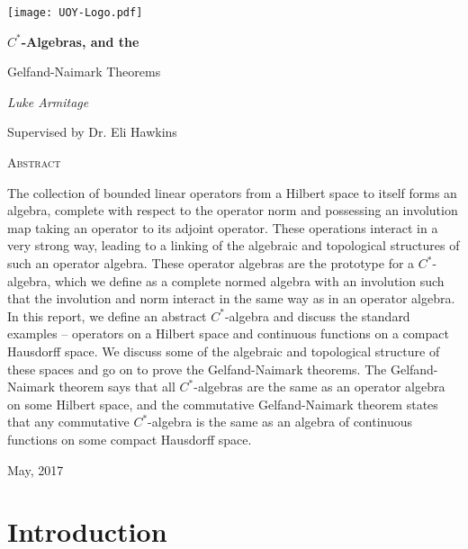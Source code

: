 \documentclass[11pt,a4paper]{report}
\theoremstyle{plain}
\theoremstyle{definition}
\newcommand{\1}{\mathbbm{1}}
\begin{document}
\begin{titlepage}
	{\centering
	{\texttt{[image: UOY-Logo.pdf]}\par 
	}
	\vspace{0.5cm}
	{\Huge \bfseries $C^\ast$-Algebras, and the 
				\par Gelfand-Naimark Theorems \par}
	\vspace{1.5cm}
	{\Large\itshape Luke Armitage \par}
	\vspace{0.25cm}
	{\large Supervised by Dr. Eli Hawkins \par}
	
	\vfill
	
	{\scshape\small Abstract \par}}
	{\small The collection of bounded linear operators from a Hilbert space to 
	itself forms an algebra, complete with respect to the operator norm and 
	possessing an involution map taking an operator to its adjoint operator. These 
	operations interact in a very strong way, leading to a linking of the algebraic 
	and topological structures of such an operator algebra. These operator algebras 
	are the prototype for a $C^\ast$-algebra, which we define as a complete normed 
	algebra with an involution such that the involution and norm interact in the 
	same way as in an operator algebra. In this report, we define an abstract 
	$C^\ast$-algebra and discuss the standard examples -- operators on a Hilbert 
	space and continuous functions on a compact Hausdorff space. We discuss some of 
	the algebraic and topological structure of these spaces and go on to prove the 
	Gelfand-Naimark theorems. The Gelfand-Naimark theorem says that all 
	$C^\ast$-algebras are the same as an operator algebra on some Hilbert space, and 
	the commutative Gelfand-Naimark theorem states that any commutative 
	$C^\ast$-algebra is the same as an algebra of continuous functions on some 
	compact Hausdorff space.}\par
	
	\vspace{1cm}
	{\large\centering May, 2017 \par}
	
\end{titlepage}

\tableofcontents
\listoftodos


\chapter{Introduction}
\end{document}
